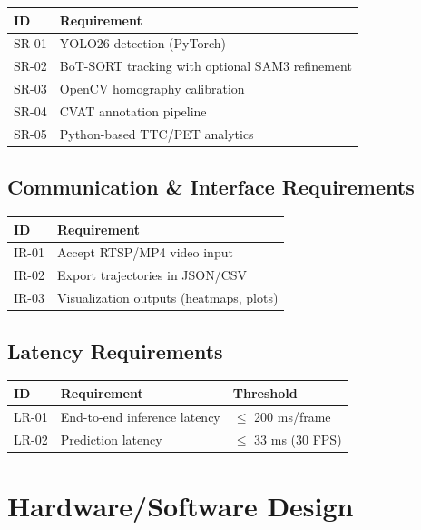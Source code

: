 \documentclass[12pt,letterpaper]{article}
\begin{document}
\begin{tabular}{|p{1.5cm}|p{10cm}|}
\hline
\textbf{ID} & \textbf{Requirement} \\
\hline
SR-01 & YOLO26 detection (PyTorch) \\
\hline
SR-02 & BoT-SORT tracking with optional SAM3 refinement \\
\hline
SR-03 & OpenCV homography calibration \\
\hline
SR-04 & CVAT annotation pipeline \\
\hline
SR-05 & Python-based TTC/PET analytics \\
\hline
\end{tabular}

\subsection{Communication \& Interface Requirements}

\begin{tabular}{|p{1.5cm}|p{10cm}|}
\hline
\textbf{ID} & \textbf{Requirement} \\
\hline
IR-01 & Accept RTSP/MP4 video input \\
\hline
IR-02 & Export trajectories in JSON/CSV \\
\hline
IR-03 & Visualization outputs (heatmaps, plots) \\
\hline
\end{tabular}

\subsection{Latency Requirements}

\begin{tabular}{|p{1.5cm}|p{6cm}|p{4cm}|}
\hline
\textbf{ID} & \textbf{Requirement} & \textbf{Threshold} \\
\hline
LR-01 & End-to-end inference latency & $\leq$ 200 ms/frame \\
\hline
LR-02 & Prediction latency & $\leq$ 33 ms (30 FPS) \\
\hline
\end{tabular}

\section{Hardware/Software Design}
\end{document}
